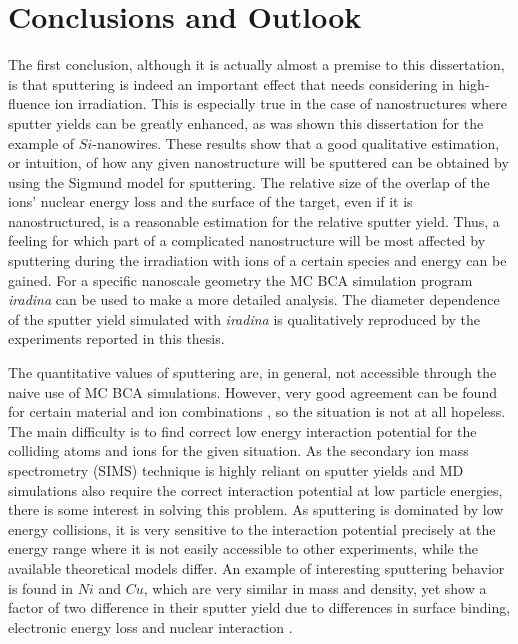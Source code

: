 \chapter{Conclusions and Outlook}

The first conclusion, although it is actually almost a premise to this dissertation, is that sputtering is indeed an important effect that needs considering in high-fluence ion irradiation. This is especially true in the case of nanostructures where sputter yields can be greatly enhanced, as was shown this dissertation for the example of $Si$-nanowires. These results show that a good qualitative estimation, or intuition, of how any given nanostructure will be sputtered can be obtained by using the Sigmund model for sputtering. The relative size of the overlap of the ions' nuclear energy loss and the surface of the target, even if it is nanostructured, is a reasonable estimation for the relative sputter yield. Thus, a feeling for which part of a complicated nanostructure will be most affected by sputtering during the irradiation with ions of a certain species and energy can be gained. For a specific nanoscale geometry the MC BCA simulation program \emph{iradina} \cite{borschel_ion_2011} can be used to make a more detailed analysis. The diameter dependence of the sputter yield simulated with \emph{iradina} is qualitatively reproduced by the experiments reported in this thesis.

The quantitative values of sputtering are, in general, not accessible through the naive use of MC BCA simulations. However, very good agreement can be found for certain material and ion combinations \cite{biersack_computer_1987,hofsass_simulation_2014}, so the situation is not at all hopeless. The main difficulty is to find correct low energy interaction potential for the colliding atoms and ions for the given situation. As the secondary ion mass spectrometry (SIMS) technique is highly reliant on sputter yields and MD simulations also require the correct interaction potential at low particle energies, there is some interest in solving this problem. As sputtering is dominated by low energy collisions, it is very sensitive to the interaction potential precisely at the energy range where it is not easily accessible to other experiments, while the available theoretical models differ. An example of interesting sputtering behavior is found in $Ni$ and $Cu$, which are very similar in mass and density, yet show a factor of two difference in their sputter yield due to differences in surface binding, electronic energy loss and nuclear interaction \cite{biersack_computer_1987}. 

